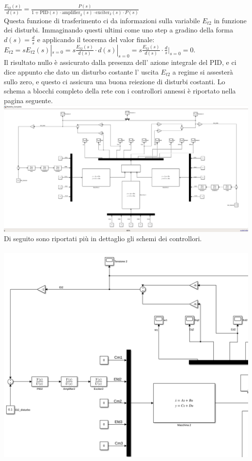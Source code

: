 \documentclass[Lau,noexaminfo]{sapthesis}
\begin{document}
	$\frac{E_{t2}(s)}{d(s)}=\frac{P(s)}{1+\text{PID}(s)\cdot \text{amplifier}_2(s)\cdot \text{exciter}_2(s) \cdot P(s)}$\\
	Questa funzione di trasferimento ci da informazioni sulla variabile $E_{t2}$ in funzione dei disturbi. Immaginando questi ultimi come uno step a gradino della forma $d(s)=\frac{d}{s}$ e applicando il teorema del valor finale:\\
	$E_{t2}=sE_{t2}(s)|_{s=0}=s\frac{E_{t2}(s)}{d(s)}\cdot d(s)|_{s=0}=s\frac{E_{t2}(s)}{d(s)}\cdot \frac{d}{s}|_{s=0}=0$.\\
	Il risultato nullo è assicurato dalla presenza dell' azione integrale del PID, e ci dice appunto che dato un disturbo costante l' uscita $E_{t2}$ a regime si assesterà sullo zero, e questo ci assicura una buona reiezione di disturbi costanti. 
	Lo schema a blocchi completo della rete con i controllori annessi è riportato nella pagina seguente.\\
	\includegraphics[scale=0.35,angle=90]{Modello_controllato}\\
	Di seguito sono riportati più in dettaglio gli schemi dei controllori.\\\\
	\includegraphics[scale=0.5,angle=90]{Dettaglio_controllore2}\\
\end{document}
